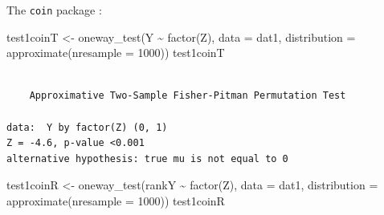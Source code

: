 \documentclass[
  12pt,
]{book}
\newenvironment{Shaded}{\begin{snugshade}}{\end{snugshade}}
\newcommand{\AttributeTok}[1]{\textcolor[rgb]{0.77,0.63,0.00}{#1}}
\newcommand{\DecValTok}[1]{\textcolor[rgb]{0.00,0.00,0.81}{#1}}
\newcommand{\DocumentationTok}[1]{\textcolor[rgb]{0.56,0.35,0.01}{\textbf{\textit{#1}}}}
\newcommand{\FunctionTok}[1]{\textcolor[rgb]{0.00,0.00,0.00}{#1}}
\newcommand{\NormalTok}[1]{#1}
\newcommand{\OtherTok}[1]{\textcolor[rgb]{0.56,0.35,0.01}{#1}}
\newcommand{\SpecialCharTok}[1]{\textcolor[rgb]{0.00,0.00,0.00}{#1}}
\theoremstyle{definition}
\theoremstyle{definition}
\theoremstyle{definition}
\theoremstyle{remark}
\begin{document}
\begin{Shaded}
\end{Shaded}

The \texttt{coin} package \citep{R-coin}:

\begin{Shaded}
\begin{Highlighting}[]
\NormalTok{test1coinT }\OtherTok{\textless{}{-}} \FunctionTok{oneway\_test}\NormalTok{(Y }\SpecialCharTok{\textasciitilde{}} \FunctionTok{factor}\NormalTok{(Z), }\AttributeTok{data =}\NormalTok{ dat1, }\AttributeTok{distribution =} \FunctionTok{approximate}\NormalTok{(}\AttributeTok{nresample =} \DecValTok{1000}\NormalTok{))}
\NormalTok{test1coinT}
\end{Highlighting}
\end{Shaded}

\begin{verbatim}

    Approximative Two-Sample Fisher-Pitman Permutation Test

data:  Y by factor(Z) (0, 1)
Z = -4.6, p-value <0.001
alternative hypothesis: true mu is not equal to 0
\end{verbatim}

\begin{Shaded}
\begin{Highlighting}[]
\NormalTok{test1coinR }\OtherTok{\textless{}{-}} \FunctionTok{oneway\_test}\NormalTok{(rankY }\SpecialCharTok{\textasciitilde{}} \FunctionTok{factor}\NormalTok{(Z), }\AttributeTok{data =}\NormalTok{ dat1, }\AttributeTok{distribution =} \FunctionTok{approximate}\NormalTok{(}\AttributeTok{nresample =} \DecValTok{1000}\NormalTok{))}
\NormalTok{test1coinR}
\end{Highlighting}
\end{Shaded}
\end{document}
